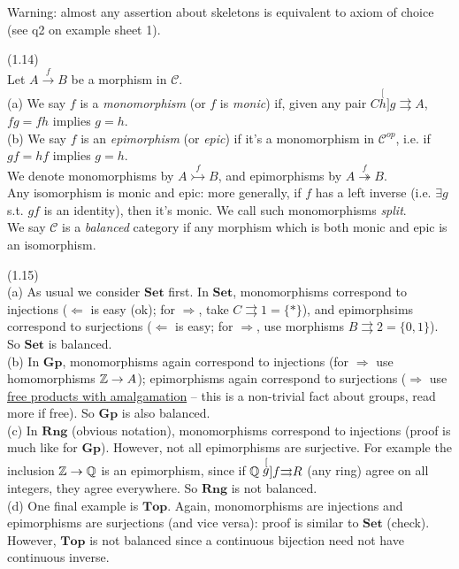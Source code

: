 \documentclass[a4paper]{article}
\begin{document}
Warning: almost any assertion about skeletons is equivalent to axiom of choice (see q2 on example sheet 1).

\begin{defi} (1.14)\\
    Let $A \xrightarrow{f} B$ be a morphism in $\mathcal{C}$.\\
    (a) We say $f$ is a \emph{monomorphism} (or $f$ is \emph{monic}) if, given any pair $C \stackrel[h]{g}{\rightrightarrows} A$, $fg=fh$ implies $g=h$.\\
    (b) We say $f$ is an \emph{epimorphism} (or \emph{epic}) if it's a monomorphism in $\mathcal{C}^{op}$, i.e. if $gf = hf$ implies $g=h$.\\
    We denote monomorphisms by $A \stackrel{f}{\rightarrowtail} B$, and epimorphisms by $A \stackrel{f}{\twoheadrightarrow} B$.\\
    Any isomorphism is monic and epic: more generally, if $f$ has a left inverse (i.e. $\exists g$ s.t. $gf$ is an identity), then it's monic. We call such monomorphisms \emph{split}.\\
    We say $\mathcal{C}$ is a \emph{balanced} category if any morphism which is both monic and epic is an isomorphism.
\end{defi}

\begin{eg} (1.15)\\
    (a) As usual we consider $\mathbf{Set}$ first. In $\mathbf{Set}$, monomorphisms correspond to injections ($\Leftarrow$ is easy (ok); for $\Rightarrow$, take $C \rightrightarrows 1 = \{*\}$), and epimorphsims correspond to surjections ($\Leftarrow$ is easy; for $\Rightarrow$, use morphisms $B \rightrightarrows 2 = \{0,1\}$). So $\mathbf{Set}$ is balanced.\\
    (b) In $\mathbf{Gp}$, monomorphisms again correspond to injections (for $\Rightarrow$ use homomorphisms $\mathbb{Z} \to A$); epimorphisms again correspond to surjections ($\Rightarrow$ use \href{https://en.wikipedia.org/wiki/Free_product#Generalization:_Free_product_with_amalgamation}{free products with amalgamation} -- this is a non-trivial fact about groups, read more if free). So $\mathbf{Gp}$ is also balanced.\\
    (c) In $\mathbf{Rng}$ (obvious notation), monomorphisms correspond to injections (proof is much like for $\mathbf{Gp}$). However, not all epimorphisms are surjective. For example the inclusion $\mathbb{Z} \to \mathbb{Q}$ is an epimorphism, since if $\mathbb{Q} \stackrel[g]{f}{\rightrightarrows} R$ (any ring) agree on all integers, they agree everywhere. So $\mathbf{Rng}$ is not balanced.\\
    (d) One final example is $\mathbf{Top}$. Again, monomorphisms are injections and epimorphisms are surjections (and vice versa): proof is similar to $\mathbf{Set}$ (check). However, $\mathbf{Top}$ is not balanced since a continuous bijection need not have continuous inverse.
\end{eg}
\end{document}
